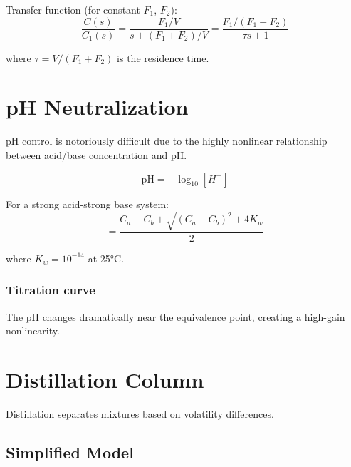 Transfer function (for constant $F_1$, $F_2$):
\begin{equation}
\frac{C(s)}{C_1(s)} = \frac{F_1/V}{s + (F_1+F_2)/V} = \frac{F_1/(F_1+F_2)}{\tau s + 1}
\end{equation}

where $\tau = V/(F_1 + F_2)$ is the residence time.

\section{pH Neutralization}
\label{sec:ph}

pH control is notoriously difficult due to the highly nonlinear relationship between acid/base concentration and pH.

\begin{equation}
\text{pH} = -\log_{10}[H^+]
\end{equation}

For a strong acid-strong base system:
\begin{equation}
[H^+] = \frac{C_a - C_b + \sqrt{(C_a - C_b)^2 + 4K_w}}{2}
\end{equation}

where $K_w = 10^{-14}$ at 25°C.

\subsubsection{Titration curve}
The pH changes dramatically near the equivalence point, creating a high-gain nonlinearity.



\section{Distillation Column}
\label{sec:distillation}

Distillation separates mixtures based on volatility differences.



\subsection{Simplified Model}

